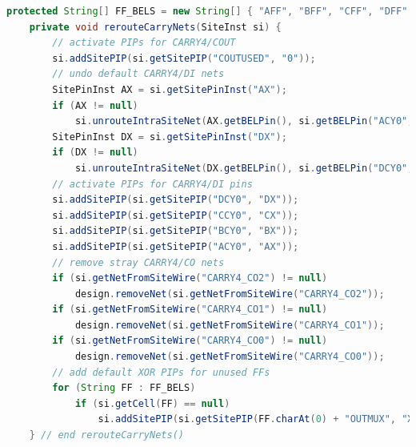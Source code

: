 \begin{lstlisting}[language=java, caption={Manually rerouting intra-Site nets in a \texttt{SLICEL} containing a \texttt{CARRY4} \texttt{Cell}}, label={lst:carry_nets}]
    protected String[] FF_BELS = new String[] { "AFF", "BFF", "CFF", "DFF" };
    private void rerouteCarryNets(SiteInst si) {
        // activate PIPs for CARRY4/COUT
        si.addSitePIP(si.getSitePIP("COUTUSED", "0"));
        // undo default CARRY4/DI nets
        SitePinInst AX = si.getSitePinInst("AX");
        if (AX != null)
            si.unrouteIntraSiteNet(AX.getBELPin(), si.getBELPin("ACY0", "AX"));
        SitePinInst DX = si.getSitePinInst("DX");
        if (DX != null)
            si.unrouteIntraSiteNet(DX.getBELPin(), si.getBELPin("DCY0", "DX"));
        // activate PIPs for CARRY4/DI pins
        si.addSitePIP(si.getSitePIP("DCY0", "DX"));
        si.addSitePIP(si.getSitePIP("CCY0", "CX"));
        si.addSitePIP(si.getSitePIP("BCY0", "BX"));
        si.addSitePIP(si.getSitePIP("ACY0", "AX"));
        // remove stray CARRY4/CO nets
        if (si.getNetFromSiteWire("CARRY4_CO2") != null)
            design.removeNet(si.getNetFromSiteWire("CARRY4_CO2"));
        if (si.getNetFromSiteWire("CARRY4_CO1") != null)
            design.removeNet(si.getNetFromSiteWire("CARRY4_CO1"));
        if (si.getNetFromSiteWire("CARRY4_CO0") != null)
            design.removeNet(si.getNetFromSiteWire("CARRY4_CO0"));
        // add default XOR PIPs for unused FFs
        for (String FF : FF_BELS)
            if (si.getCell(FF) == null)
                si.addSitePIP(si.getSitePIP(FF.charAt(0) + "OUTMUX", "XOR"));
    } // end rerouteCarryNets()
\end{lstlisting}

